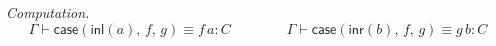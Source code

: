 \documentclass{article}
\newcommand{\Type}{\ensuremath{\mathsf{Type}}}
\newcommand{\inl}{\mathsf{inl}}
\newcommand{\inr}{\mathsf{inr}}
\newcommand{\caseof}{\mathsf{case}}
\newcommand{\jdeq}{\equiv}                 %
\newcommand{\teq}[4]{#1 \vdash #2 \jdeq #3 : #4} %
\begin{document}
\medskip
\noindent
\emph{Computation.}
\[
\teq{\Gamma}{\caseof(\inl(a),\,f,\,g)}{f\,a}{C}
\qquad\qquad
\teq{\Gamma}{\caseof(\inr(b),\,f,\,g)}{g\,b}{C}
\]







\end{document}
